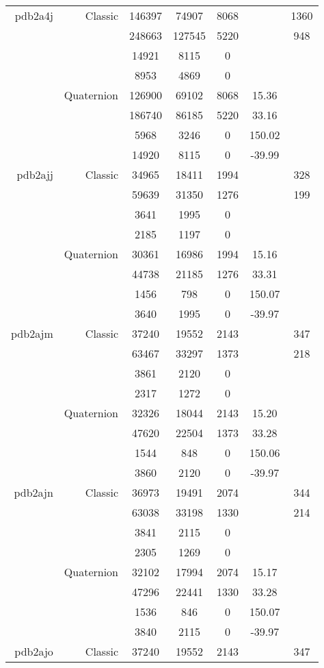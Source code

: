 \begin{xltabular}{\textwidth}{r|rcccSc}
pdb2a4j & Classic & 146397 & 74907 & 8068 & & 1360 \\
& & 248663 & 127545 & 5220 & & 948 \\
& & 14921 & 8115 & 0 & & \\
& & 8953 & 4869 & 0 & & \\
& Quaternion & 126900 & 69102 & 8068 & 15.36 & \\
& & 186740 & 86185 & 5220 & 33.16 & \\
& & 5968 & 3246 & 0 & 150.02 & \\
& & 14920 & 8115 & 0 & -39.99 & \\ \addlinespace
pdb2ajj & Classic & 34965 & 18411 & 1994 & & 328 \\
& & 59639 & 31350 & 1276 & & 199 \\
& & 3641 & 1995 & 0 & & \\
& & 2185 & 1197 & 0 & & \\
& Quaternion & 30361 & 16986 & 1994 & 15.16 & \\
& & 44738 & 21185 & 1276 & 33.31 & \\
& & 1456 & 798 & 0 & 150.07 & \\
& & 3640 & 1995 & 0 & -39.97 & \\ \addlinespace
pdb2ajm & Classic & 37240 & 19552 & 2143 & & 347 \\
& & 63467 & 33297 & 1373 & & 218 \\
& & 3861 & 2120 & 0 & & \\
& & 2317 & 1272 & 0 & & \\
& Quaternion & 32326 & 18044 & 2143 & 15.20 & \\
& & 47620 & 22504 & 1373 & 33.28 & \\
& & 1544 & 848 & 0 & 150.06 & \\
& & 3860 & 2120 & 0 & -39.97 & \\ \addlinespace
pdb2ajn & Classic & 36973 & 19491 & 2074 & & 344 \\
& & 63038 & 33198 & 1330 & & 214 \\
& & 3841 & 2115 & 0 & & \\
& & 2305 & 1269 & 0 & & \\
& Quaternion & 32102 & 17994 & 2074 & 15.17 & \\
& & 47296 & 22441 & 1330 & 33.28 & \\
& & 1536 & 846 & 0 & 150.07 & \\
& & 3840 & 2115 & 0 & -39.97 & \\ \addlinespace
pdb2ajo & Classic & 37240 & 19552 & 2143 & & 347 \\

\end{xltabular}
